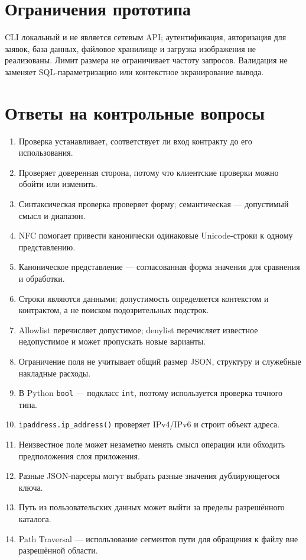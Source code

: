 \documentclass[12pt,a4paper]{article}
\begin{document}
\section{Ограничения прототипа}
CLI локальный и не является сетевым API; аутентификация, авторизация для заявок, база данных, файловое хранилище и загрузка изображения не реализованы. Лимит размера не ограничивает частоту запросов. Валидация не заменяет SQL-параметризацию или контекстное экранирование вывода.

\section{Ответы на контрольные вопросы}
\begin{enumerate}
\item Проверка устанавливает, соответствует ли вход контракту до его использования.
\item Проверяет доверенная сторона, потому что клиентские проверки можно обойти или изменить.
\item Синтаксическая проверка проверяет форму; семантическая — допустимый смысл и диапазон.
\item NFC помогает привести канонически одинаковые Unicode-строки к одному представлению.
\item Каноническое представление — согласованная форма значения для сравнения и обработки.
\item Строки являются данными; допустимость определяется контекстом и контрактом, а не поиском подозрительных подстрок.
\item Allowlist перечисляет допустимое; denylist перечисляет известное недопустимое и может пропускать новые варианты.
\item Ограничение поля не учитывает общий размер JSON, структуру и служебные накладные расходы.
\item В Python \texttt{bool} — подкласс \texttt{int}, поэтому используется проверка точного типа.
\item \texttt{ipaddress.ip\_address()} проверяет IPv4/IPv6 и строит объект адреса.
\item Неизвестное поле может незаметно менять смысл операции или обходить предположения слоя приложения.
\item Разные JSON-парсеры могут выбрать разные значения дублирующегося ключа.
\item Путь из пользовательских данных может выйти за пределы разрешённого каталога.
\item Path Traversal — использование сегментов пути для обращения к файлу вне разрешённой области.

\end{enumerate}
\end{document}
